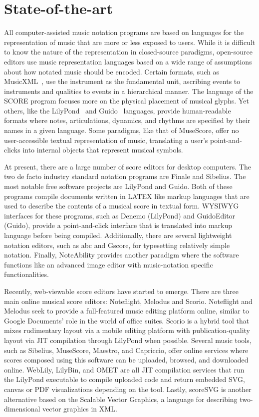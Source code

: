 \documentclass{article}
\begin{document}
\section{State-of-the-art}\label{sec:state-of-the-art}

All computer-assisted music notation programs are based on languages for the
representation of music that are more or less exposed to users. While it is
difficult to know the nature of the representation in closed-source
paradigms, open-source editors use music representation languages based on a
wide range of assumptions about how notated music should be encoded. Certain
formats, such as MusicXML~\cite{good2001musicxml}, use the instrument as the fundamental unit,
ascribing events to instruments and qualities to events in a hierarchical
manner. The language of the SCORE program focuses more on the physical
placement of musical glyphs. Yet others, like the LilyPond~\cite{lilypond06} and
Guido~\cite{hoos98}
languages, provide human-readable formats where notes, articulations,
dynamics, and rhythms are specified by their names in a given language. Some
paradigms, like that of MuseScore, offer no user-accessible textual representation
of music, translating a user’s point-and-clicks into internal objects that
represent musical symbols.

At present, there are a large number of score editors for desktop computers.
The two de facto industry standard notation programs are Finale and
Sibelius. The most notable free software projects are LilyPond and
Guido. Both of these programs compile documents written in LATEX like
markup languages that are used to describe the contents of a musical score
in textual form. WYSIWYG interfaces for these programs, such as Denemo
(LilyPond) and GuidoEditor (Guido), provide a point-and-click interface that
is translated into markup language before being compiled. Additionally,
there are several lightweight notation editors, such as abc and Gscore, for
typesetting relatively simple notation. Finally, NoteAbility provides
another paradigm where the software functions like an advanced image editor
with music-notation specific functionalities.

Recently, web-viewable score editors have started to emerge. There are three
main online musical score editors: Noteflight, Melodus and Scorio.
Noteflight and Melodus seek to provide a full-featured music editing
platform online, similar to Google Documents’ role in the world of office
suites. Scorio is a hybrid tool that mixes rudimentary layout via a mobile
editing platform with publication-quality layout via JIT compilation through
LilyPond when possible. Several music tools, such as Sibelius, MuseScore,
Maestro, and Capriccio, offer online services where scores composed using
this software can be uploaded, browsed, and downloaded online. WebLily,
LilyBin, and OMET are all JIT compilation services that run the LilyPond
executable to compile uploaded code and return embedded SVG, canvas or PDF
visualizations depending on the tool. Lastly, scoreSVG is another
alternative based on the Scalable Vector Graphics, a language for describing
two-\-di\-men\-sion\-al vector graphics in XML.
\end{document}
